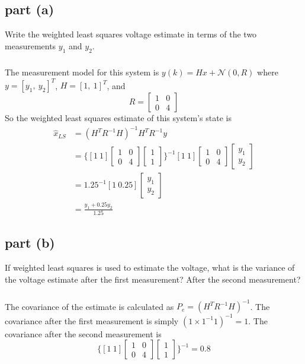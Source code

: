 \documentclass[11pt]{article}
\begin{document}
\subsection*{part (a)}
Write the weighted least squares voltage estimate in terms of the two measurements $y_1$ and $y_2$.

\subparagraph*{}
The measurement model for this system is $y(k)=Hx+\mathcal{N}(0,R)$ where $y=[y_1,\ y_2]^T$, $H=[1,\ 1]^T$, and 
\begin{equation*}
	R = \begin{bmatrix} 1 & 0 \\ 0 & 4 \end{bmatrix}
\end{equation*}
So the weighted least squares estimate of this system's state is
\begin{align*}
	\hat{x}_{LS} &= (H^TR^{-1}H)^{-1}H^TR^{-1}y \\
	&= \Bigg\{ [1\ 1] \begin{bmatrix} 1&0\\0&4 \end{bmatrix} \begin{bmatrix} 1\\1 \end{bmatrix} \Bigg\}^{-1} [1\ 1] \begin{bmatrix} 1&0\\0&4 \end{bmatrix} \begin{bmatrix} y_1 \\ y_2 \end{bmatrix} \\
	&= 1.25^{-1} [1\ 0.25]\begin{bmatrix} y_1 \\ y_2 \end{bmatrix} \\
	&= \frac{y_1 + 0.25y_2}{1.25}
\end{align*}

\subsection*{part (b)}
If weighted least squares is used to estimate the voltage, what is the variance of the voltage estimate after the first measurement? After the second measurement?

\subparagraph*{}
The covariance of the estimate is calculated as $P_e=(H^TR^{-1}H)^{-1}$. The covariance after the first measurement is simply $(1\times1^{-1}1)^{-1}=1$. The covariance after the second measurement is
\begin{equation*}
	\Bigg\{ [1\ 1] \begin{bmatrix} 1 & 0 \\ 0 & 4 \end{bmatrix} \begin{bmatrix} 1\\1 \end{bmatrix} \Bigg\}^{-1} = 0.8
\end{equation*}
\end{document}
